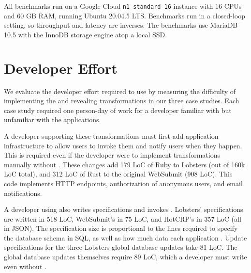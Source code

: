 All benchmarks run on a Google Cloud \texttt{n1-standard-16} instance with 16
CPUs and 60 GB RAM, running Ubuntu 20.04.5 LTS. Benchmarks run in a closed-loop
setting, so throughput and latency are inverses. %
%
The benchmarks use MariaDB 10.5 with the InnoDB storage engine atop a local SSD.
%

\section{\sys Developer Effort}
\label{s:eval-effort}


%
We evaluate the developer effort required to use \sys by measuring the
difficulty of implementing the \xxing and revealing transformations in our three
case studies.  Each case study required one person-day of work for a developer
familiar with \sys but unfamiliar with the applications.

A developer supporting these transformations must first add application
infrastructure to allow users to invoke them and notify users when they happen.
This is required even if the developer were to implement transformations
manually without \sys.
%
These changes add 179 LoC of Ruby to Lobsters (out of 160k LoC total), and 312 LoC of Rust
to the original WebSubmit (908 LoC). This code implements HTTP endpoints,
authorization of anonymous users, and email notifications.
%

%
A developer using \sys also writes \xx specifications and invokes \sys.
Lobsters' \xx specifications are written in 518 LoC, WebSubmit's in 75 LoC, and
HotCRP's in 357 LoC (all in JSON).  The specification size is proportional to
the lines required to specify the database schema in SQL, as well as how much data
each application \xxs.
%
Update specifications for the three Lobsters global database updates take 81
LoC. The global database updates themselves require 89 LoC, which a developer
must write even without \sys.
%

